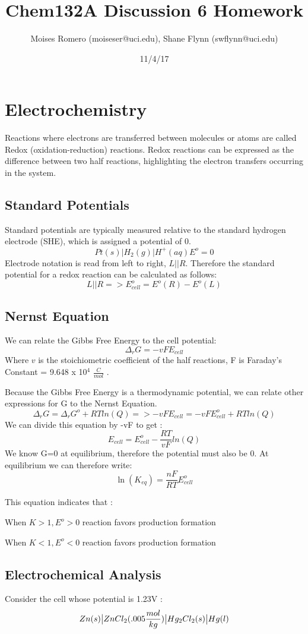 \documentclass{article}
\title{Chem132A Discussion 6 Homework}
\author{Moises Romero (moiseser@uci.edu), Shane Flynn (swflynn@uci.edu) }
\date{11/4/17}
\newcommand{\be}{\begin{equation}}
\newcommand{\ee}{\end{equation}}
\begin{document}
\maketitle

\section{Electrochemistry}
Reactions where electrons are transferred between molecules or atoms are called Redox (oxidation-reduction) reactions. 
Redox reactions can be expressed as the difference between two half reactions, highlighting the electron transfers occurring in the system. 

\subsection*{Standard Potentials}
Standard potentials are typically measured relative to the standard hydrogen electrode (SHE), which is assigned a potential of 0. 
\be
Pt(s)|H_2(g)|H^+(aq) E^o=0
\ee
Electrode notation is read from left to right, $L||R$. Therefore the standard potential for a redox reaction can be calculated as follows: 
\be
L||R => E_{cell}^o = E^o (R) - E^o (L)
\ee
\subsection*{Nernst Equation}
We can relate the Gibbs Free Energy to the cell potential:
\be
\Delta_r G = -vFE_{cell}
\ee
Where $v$ is the stoichiometric coefficient of the half reactions, F is Faraday's Constant = 9.648 x 10$^4$ $\frac{C}{mol}$ . 

Because the Gibbs Free Energy is a thermodynamic potential, we can relate other expressions for G to the Nernst Equation. 
\be
\Delta_r G =\Delta_r G^o + RTln(Q) => -vFE_{cell} = -vFE^o_{cell} + RTln(Q) 
\ee
We can divide this equation by -vF to get : 
\be
E_{cell} = E^o_{cell} - \frac{RT}{vF}ln(Q)
\ee
We know G=0 at equilibrium, therefore the potential must also be 0.
At equilibrium we can therefore write: 
\be
\ln(K_{eq}) = \frac{nF}{RT}E^o_{cell}
\ee

This equation indicates that :

\bigskip

When $K>1 , E^{o}>0$ reaction favors production formation

\bigskip
When $K<1 , E^{o}<0$ reaction favors production formation

\subsection*{Electrochemical Analysis}
Consider the cell whose potential is 1.23V :
\be
Zn(s)\big|ZnCl_2(.005\small{\frac{mol}{kg}})\big|Hg_2Cl_2(s)\big|Hg(l)
\ee
\end{document}
